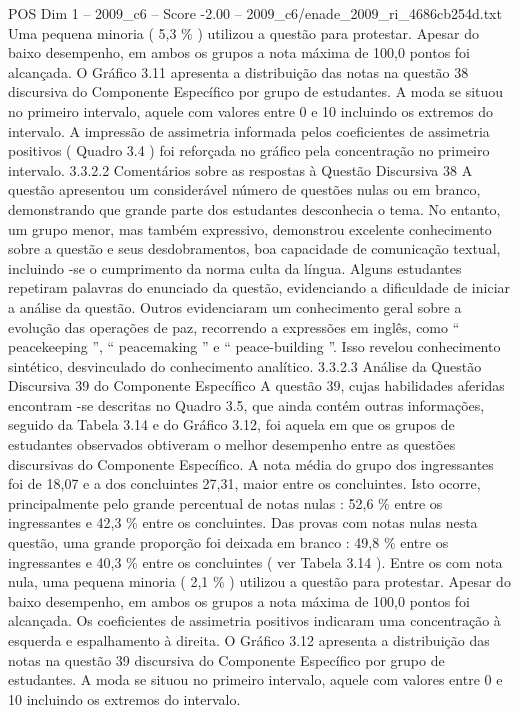 \begin{textsample}{POS Dim 1 – 2009\_c6 – Score -2.00 – 2009\_c6/enade\_2009\_ri\_4686cb254d.txt}
Uma pequena minoria ( 5,3 \% ) utilizou a questão para protestar.
Apesar do baixo desempenho, em ambos os grupos a nota máxima de 100,0 pontos foi alcançada.
O Gráfico 3.11 apresenta a distribuição das notas na questão 38 discursiva do Componente Específico por grupo de estudantes.
A moda se situou no primeiro intervalo, aquele com valores entre 0 e 10 incluindo os extremos do intervalo.
A impressão de assimetria informada pelos coeficientes de assimetria positivos ( Quadro 3.4 ) foi reforçada no gráfico pela concentração no primeiro intervalo. 3.3.2.2 Comentários sobre as respostas à Questão Discursiva 38 A questão apresentou um considerável número de questões nulas ou em branco, demonstrando que grande parte dos estudantes desconhecia o tema.
No entanto, um grupo menor, mas também expressivo, demonstrou excelente conhecimento sobre a questão e seus desdobramentos, boa capacidade de comunicação textual, incluindo -se o cumprimento da norma culta da língua.
Alguns estudantes repetiram palavras do enunciado da questão, evidenciando a dificuldade de iniciar a análise da questão.
Outros evidenciaram um conhecimento geral sobre a evolução das operações de paz, recorrendo a expressões em inglês, como “ peacekeeping ”, “ peacemaking ” e “ peace-building ”.
Isso revelou conhecimento sintético, desvinculado do conhecimento analítico. 3.3.2.3 Análise da Questão Discursiva 39 do Componente Específico A questão 39, cujas habilidades aferidas encontram -se descritas no Quadro 3.5, que ainda contém outras informações, seguido da Tabela 3.14 e do Gráfico 3.12, foi aquela em que os grupos de estudantes observados obtiveram o melhor desempenho entre as questões discursivas do Componente Específico.
A nota média do grupo dos ingressantes foi de 18,07 e a dos concluintes 27,31, maior entre os concluintes.
Isto ocorre, principalmente pelo grande percentual de notas nulas : 52,6 \% entre os ingressantes e 42,3 \% entre os concluintes.
Das provas com notas nulas nesta questão, uma grande proporção foi deixada em branco : 49,8 \% entre os ingressantes e 40,3 \% entre os concluintes ( ver Tabela 3.14 ).
Entre os com nota nula, uma pequena minoria ( 2,1 \% ) utilizou a questão para protestar.
Apesar do baixo desempenho, em ambos os grupos a nota máxima de 100,0 pontos foi alcançada.
Os coeficientes de assimetria positivos indicaram uma concentração à esquerda e espalhamento à direita.
O Gráfico 3.12 apresenta a distribuição das notas na questão 39 discursiva do Componente Específico por grupo de estudantes.
A moda se situou no primeiro intervalo, aquele com valores entre 0 e 10 incluindo os extremos do intervalo.

\end{textsample}
